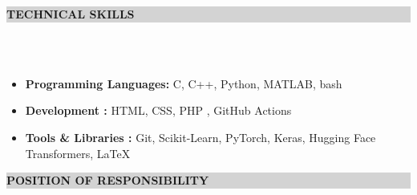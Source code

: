 \documentclass[a4paper,10.5pt]{article}
\newcommand{\lsep}{-0.5cm}
\newcommand{\resheading}[1]{{\small \colorbox{lightgray}{\begin{minipage}{0.975\textwidth}{\textbf{#1 \vphantom{p\^{E}}}}\end{minipage}}}}
\begin{document}
\resheading{\textbf{ TECHNICAL SKILLS}} \\[\lsep] \\[-0.4cm]
\vspace{0.1cm}
\begin{itemize}
    \item \textbf{Programming Languages:} C, C++, Python, MATLAB, bash
    \vspace{-0.19cm}
    
    \item \textbf{Development :} HTML, CSS, PHP , GitHub Actions
    \vspace{-0.19cm}
    
    \item \textbf{Tools \& Libraries :} Git, Scikit-Learn, PyTorch, Keras, Hugging Face Transformers, \LaTeX
    \vspace{-0.10cm}
\end{itemize}
    
\vspace{0.1cm}
\resheading{\textbf{POSITION OF RESPONSIBILITY}}\\[\lsep] \\[-0.4cm]
\vspace{0.3cm}
\end{document}
